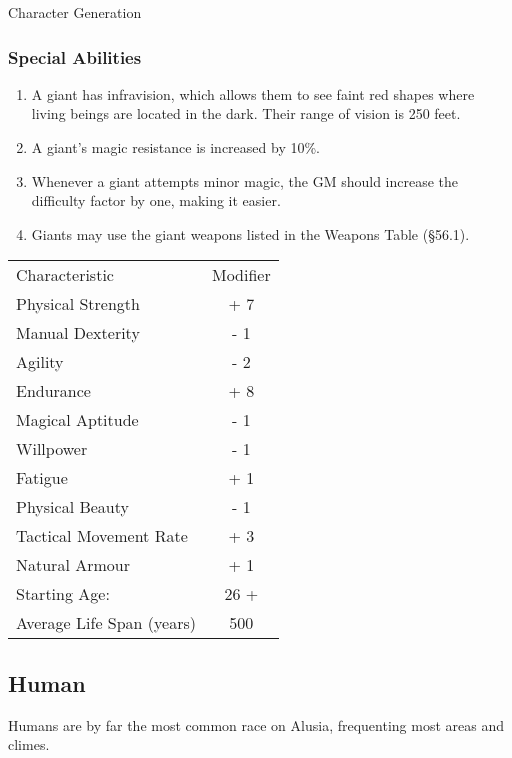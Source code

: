 \begin{Chapter}{Character Generation}
\subsubsection{Special Abilities}

\begin{enumerate}
\item A giant has infravision, which allows them to see faint red
  shapes where living beings are located in the dark. Their range of
  vision is 250 feet.

\item A giant’s magic resistance is increased by 10\%. 

\item Whenever a giant attempts minor magic, the GM should increase
  the difficulty factor by one, making it easier.

\item Giants may use the giant weapons listed in the Weapons Table
  (§56.1).

\end{enumerate}

\begin{tabularx}{\columnwidth}{Xc}
Characteristic			& Modifier \\
Physical Strength		& + 7 \\
Manual Dexterity		& - 1 \\
Agility				& - 2 \\
Endurance			& + 8 \\
Magical Aptitude		& - 1 \\
Willpower			& - 1 \\
Fatigue				& + 1 \\
Physical Beauty			& - 1 \\
Tactical Movement Rate		& + 3 \\
Natural Armour			& + 1 \\
Starting Age:			& 26 + \\
Average Life Span (years)	& 500 \\
\end{tabularx}

\subsection{Human}

Humans are by far the most common race on Alusia, frequenting most
areas and climes.


\end{Chapter}
